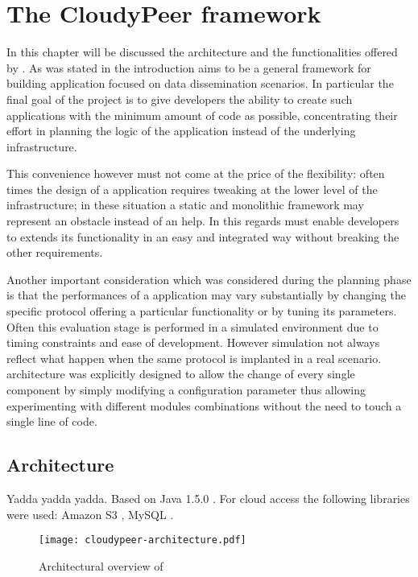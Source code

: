 \chapter{The CloudyPeer framework}
In this chapter will be discussed the architecture and the
functionalities offered by \cloudypeer. As was stated in the
introduction \cloudypeer aims to be a general framework for building
\ptop application focused on data dissemination scenarios.
In particular the final goal of the project is to give developers the
ability to create such applications with the minimum amount of code as
possible, concentrating their effort in planning the logic of the
application instead of the underlying \ptop infrastructure.

This convenience however must not come at the price of the
flexibility: often times the design of a \ptop application requires
tweaking at the lower level of the infrastructure; in these situation
a static and monolithic framework may represent an obstacle instead of
an help.
In this regards \cloudypeer must enable developers to extends its
functionality in an easy and integrated way without breaking the other
requirements.

Another important consideration which was considered during the
planning phase is that the performances of a \ptop application may
vary substantially by changing the specific protocol offering a
particular functionality or by tuning its parameters. Often this
evaluation stage is performed in a simulated environment due to timing
constraints and ease of development. However simulation not always
reflect what happen when the same protocol is implanted in a real
scenario.
\cloudypeer architecture was explicitly designed to allow the change
of every single component by simply modifying a configuration
parameter thus allowing experimenting with different modules
combinations without the need to touch a single line of code.


\section{Architecture}
Yadda yadda yadda. Based on Java 1.5.0 \cite{JDK5Documentation}. For
cloud access the following libraries were used: Amazon S3
\cite{AWS4Java}, MySQL \cite{MySQLConnectorJava}.

\begin{figure}[H]
  \centering
  \texttt{[image: cloudypeer-architecture.pdf]}
  \caption{Architectural overview of \cloudypeer}
  \label{fig:cloudypeer-sequence-architecture}
\end{figure}

